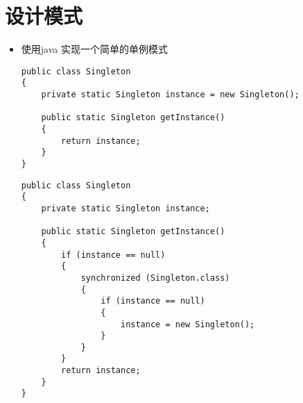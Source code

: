 \documentclass[11pt]{article}
\begin{document}
\section{设计模式}
\label{sec:orgda4e73f}
\begin{itemize}
\item 使用java 实现一个简单的单例模式
\begin{verbatim}
public class Singleton
{
    private static Singleton instance = new Singleton();

    public static Singleton getInstance()
    {
        return instance;
    }
}
\end{verbatim}
\begin{verbatim}
public class Singleton
{
    private static Singleton instance;

    public static Singleton getInstance()
    {
        if (instance == null)
        {
            synchronized (Singleton.class)
            {
                if (instance == null)
                {
                    instance = new Singleton();
                }
            }
        }
        return instance;
    }
}

\end{verbatim}
\end{itemize}
\end{document}
